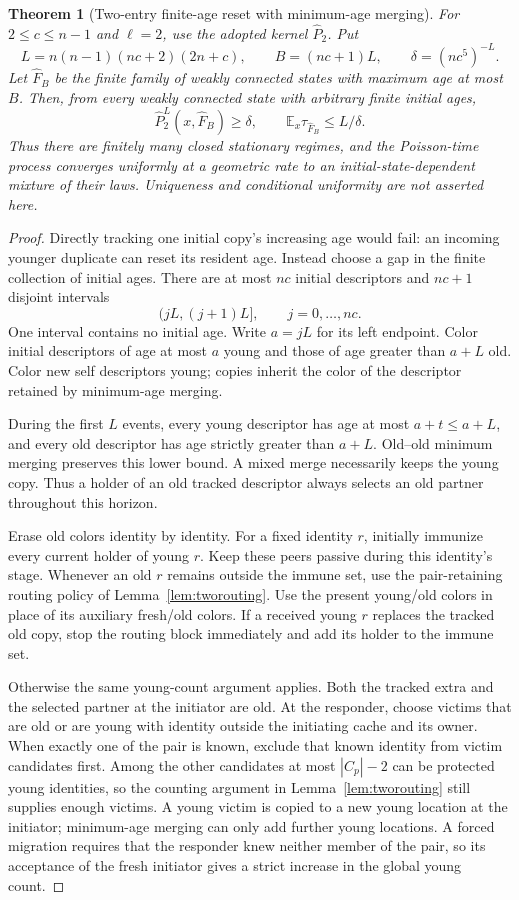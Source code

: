 \documentclass[11pt]{article}
\newtheorem{theorem}{Theorem}
\begin{document}
\begin{theorem}[Two-entry finite-age reset with minimum-age merging]
\label{thm:thesistwo}
For $2\le c\le n-1$ and $\ell=2$, use the adopted kernel
$\widehat P_2$. Put
\[
 L=n(n-1)(nc+2)(2n+c),\qquad
 B=(nc+1)L,\qquad \delta=(nc^5)^{-L}.
\]
Let $\widehat F_B$ be the finite family of weakly connected
states with maximum age at most $B$. Then, from every weakly
connected state with arbitrary finite initial ages,
\[
 \widehat P_2^L(x,\widehat F_B)\ge\delta,\qquad
 \mathbb E_x\tau_{\widehat F_B}\le L/\delta.
\]
Thus there are finitely many closed stationary regimes, and
the Poisson-time process converges uniformly at a geometric
rate to an initial-state-dependent mixture of their laws.
Uniqueness and conditional uniformity are not asserted here.
\end{theorem}
\begin{proof}
Directly tracking one initial copy's increasing age would fail:
an incoming younger duplicate can reset its resident age.
Instead choose a gap in the finite collection of initial ages.
There are at most $nc$ initial descriptors and $nc+1$ disjoint
intervals
\[
 (jL,(j+1)L],\qquad j=0,\ldots,nc.
\]
One interval contains no initial age. Write $a=jL$ for its
left endpoint. Color initial descriptors of age at most $a$
young and those of age greater than $a+L$ old.
Color new self descriptors young; copies inherit the color
of the descriptor retained by minimum-age merging.

During the first $L$ events, every young descriptor has age
at most $a+t\le a+L$, and every old descriptor has age
strictly greater than $a+L$. Old--old minimum merging
preserves this lower bound. A mixed merge necessarily keeps
the young copy. Thus a holder of an old tracked descriptor
always selects an old partner throughout this horizon.

Erase old colors identity by identity. For a fixed identity
$r$, initially immunize every current holder of young $r$.
Keep these peers passive during this identity's stage.
Whenever an old $r$ remains outside the immune set, use the
pair-retaining routing policy of Lemma~\ref{lem:tworouting}.
Use the present young/old colors in place of its auxiliary
fresh/old colors. If a received young $r$ replaces the
tracked old copy, stop the routing block immediately and
add its holder to the immune set.

Otherwise the same young-count argument applies. Both the
tracked extra and the selected partner at the initiator are
old. At the responder, choose victims that are old or are
young with identity outside the initiating cache and its
owner. When exactly one of the pair is known, exclude that
known identity from victim candidates first. Among the other
candidates at most $|C_p|-2$ can be protected young identities,
so the counting argument in Lemma~\ref{lem:tworouting}
still supplies enough victims. A young victim is copied to
a new young location at the initiator; minimum-age merging
can only add further young locations. A forced migration
requires that the responder knew neither member of the pair,
so its acceptance of the fresh initiator gives a strict
increase in the global young count.


\end{proof}
\end{document}
